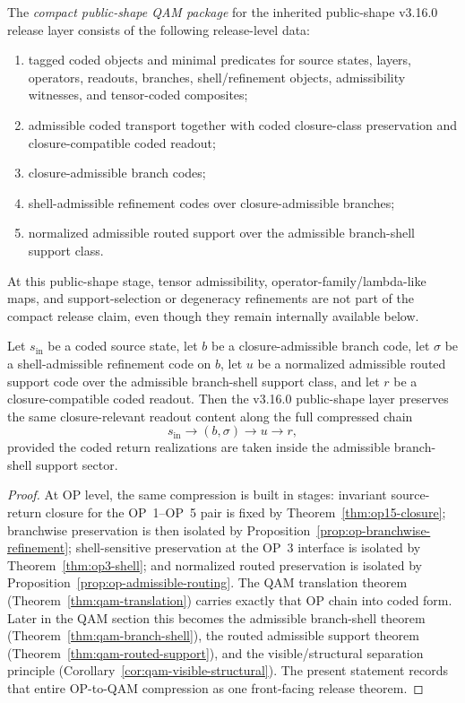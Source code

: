 \begin{definition}
The \emph{compact public-shape QAM package} for the inherited public-shape v3.16.0 release layer consists of the following release-level data:
\begin{enumerate}[leftmargin=2em]
  \item tagged coded objects and minimal predicates for source states, layers, operators, readouts, branches, shell/refinement objects, admissibility witnesses, and tensor-coded composites;
  \item admissible coded transport together with coded closure-class preservation and closure-compatible coded readout;
  \item closure-admissible branch codes;
  \item shell-admissible refinement codes over closure-admissible branches;
  \item normalized admissible routed support over the admissible branch-shell support class.
\end{enumerate}
At this public-shape stage, tensor admissibility, operator-family/lambda-like maps, and support-selection or degeneracy refinements are not part of the compact release claim, even though they remain internally available below.
\end{definition}

\begin{theorem}\label{thm:compact-public-shape-preservation}
Let $s_{\mathrm{in}}$ be a coded source state, let $b$ be a closure-admissible branch code, let $\sigma$ be a shell-admissible refinement code on $b$, let $u$ be a normalized admissible routed support code over the admissible branch-shell support class, and let $r$ be a closure-compatible coded readout. Then the v3.16.0 public-shape layer preserves the same closure-relevant readout content along the full compressed chain
\[
s_{\mathrm{in}}
\longrightarrow
(b,\sigma)
\longrightarrow
u
\longrightarrow
r,
\]
provided the coded return realizations are taken inside the admissible branch-shell support sector.
\end{theorem}

\begin{proof}
At OP level, the same compression is built in stages: invariant source-return closure for the OP~1--OP~5 pair is fixed by Theorem~\ref{thm:op15-closure}; branchwise preservation is then isolated by Proposition~\ref{prop:op-branchwise-refinement}; shell-sensitive preservation at the OP~3 interface is isolated by Theorem~\ref{thm:op3-shell}; and normalized routed preservation is isolated by Proposition~\ref{prop:op-admissible-routing}. The QAM translation theorem (Theorem~\ref{thm:qam-translation}) carries exactly that OP chain into coded form. Later in the QAM section this becomes the admissible branch-shell theorem (Theorem~\ref{thm:qam-branch-shell}), the routed admissible support theorem (Theorem~\ref{thm:qam-routed-support}), and the visible/structural separation principle (Corollary~\ref{cor:qam-visible-structural}). The present statement records that entire OP-to-QAM compression as one front-facing release theorem.
\end{proof}

